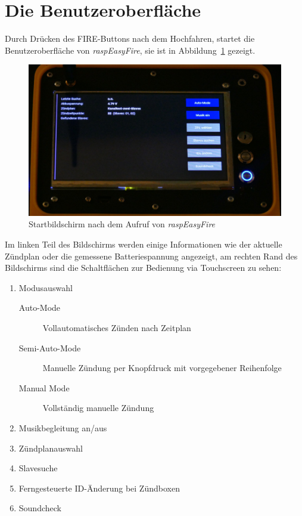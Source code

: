 \documentclass[paper=a4, parskip, numbers=noenddot, toc=listof, headsepline]{scrbook}
\newcommand{\REF}{\emph{raspEasyFire}}
\begin{document}
		\section{Die Benutzeroberfläche}

			Durch Drücken des FIRE-Buttons nach dem Hochfahren, startet die Benutzeroberfläche von {\REF}, sie ist in Abbildung~\ref{fig:REFstartscreen} gezeigt.

			\begin{figure}
				\centering\includegraphics[width=150mm]{Bilder/REFstartscreen}
				\caption{Startbildschirm nach dem Aufruf von \REF}
				\label{fig:REFstartscreen}
			\end{figure}

			Im linken Teil des Bildschirms werden einige Informationen wie der aktuelle Zündplan oder die gemessene Batteriespannung angezeigt, am rechten Rand des Bildschirms sind die Schaltflächen zur Bedienung via Touchscreen zu sehen:
			\begin{enumerate}
				\item Modusauswahl
				      \begin{description}
					      \item [Auto-Mode] Vollautomatisches Zünden nach Zeitplan
					      \item [Semi-Auto-Mode] Manuelle Zündung per Knopfdruck mit vorgegebener Reihenfolge
					      \item [Manual Mode] Vollständig manuelle Zündung
				      \end{description}
				\item Musikbegleitung an/aus
				\item Zündplanauswahl
				\item Slavesuche
				\item Ferngesteuerte ID-Änderung bei Zündboxen
				\item Soundcheck
			\end{enumerate}
\end{document}

